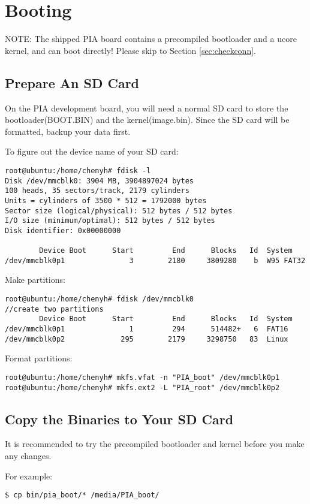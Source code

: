 \documentclass[a4paper]{article}
\begin{document}
\section{Booting}
NOTE: The shipped PIA board contains a precompiled bootloader and a 
ucore kernel, and can boot directly! Please skip to Section \ref{sec:checkconn}.
\subsection{Prepare An SD Card}

On the PIA development board, you will need a normal SD card to store
the bootloader(BOOT.BIN) and the kernel(image.bin).
Since the SD card will be formatted, backup your data first.

To figure out the device name of your SD card:
\begin{verbatim}
root@ubuntu:/home/chenyh# fdisk -l
Disk /dev/mmcblk0: 3904 MB, 3904897024 bytes
100 heads, 35 sectors/track, 2179 cylinders
Units = cylinders of 3500 * 512 = 1792000 bytes
Sector size (logical/physical): 512 bytes / 512 bytes
I/O size (minimum/optimal): 512 bytes / 512 bytes
Disk identifier: 0x00000000

        Device Boot      Start         End      Blocks   Id  System
/dev/mmcblk0p1               3        2180     3809280    b  W95 FAT32
\end{verbatim}

Make partitions:
\begin{verbatim}
root@ubuntu:/home/chenyh# fdisk /dev/mmcblk0
//create two partitions
        Device Boot      Start         End      Blocks   Id  System
/dev/mmcblk0p1               1         294      514482+   6  FAT16
/dev/mmcblk0p2             295        2179     3298750   83  Linux
\end{verbatim}

Format partitions:
\begin{verbatim}
root@ubuntu:/home/chenyh# mkfs.vfat -n "PIA_boot" /dev/mmcblk0p1
root@ubuntu:/home/chenyh# mkfs.ext2 -L "PIA_root" /dev/mmcblk0p2
\end{verbatim}

\subsection{Copy the Binaries to Your SD Card}
It is recommended to try the precompiled bootloader and kernel before
you make any changes.

For example:
\begin{verbatim}
$ cp bin/pia_boot/* /media/PIA_boot/
\end{verbatim}
\end{document}
